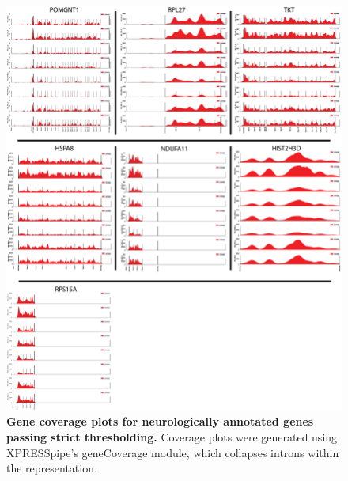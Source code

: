 \documentclass[10pt, oneside]{article}
\begin{document}
\begin{figure}
\centering
  \includegraphics[width=180mm]{figures/xpresspipe_supplement7.png}
  \caption{\textbf{Gene coverage plots for neurologically annotated genes passing strict thresholding.} Coverage plots were generated using XPRESSpipe's geneCoverage module, which collapses introns within the representation.}
  \label{fig:supplement7}
\end{figure}
\end{document}
